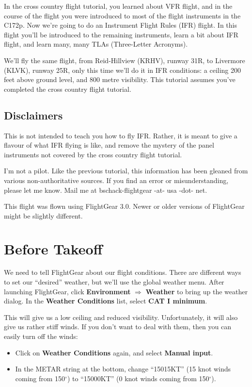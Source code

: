 In the cross country flight tutorial, you learned about VFR flight,
and in the course of the flight you were introduced to most of the
flight instruments in the C172p.  Now we're going to do an Instrument
Flight Rules (IFR) flight.  In this flight you'll be introduced to the
remaining instruments, learn a bit about IFR flight, and learn many,
many TLAs (Three-Letter Acronyms).

We'll fly the same flight, from Reid-Hillview (KRHV), runway 31R, to
Livermore (KLVK), runway 25R, only this time we'll do it in IFR
conditions: a ceiling 200 feet above ground level, and 800 metre
visibility.  This tutorial assumes you've completed the cross country
flight tutorial.
\subsection{Disclaimers}

This is not intended to teach you how to fly IFR.  Rather, it is meant
to give a flavour of what IFR flying is like, and remove the mystery
of the panel instruments not covered by the cross country flight
tutorial.

I'm not a pilot.  Like the previous tutorial, this information has
been gleaned from various non-authoritative sources.  If you find an
error or misunderstanding, please let me know.  Mail me at
bschack-flightgear -at- usa -dot- net.

This flight was flown using FlightGear 3.0.  Newer or older versions
of FlightGear might be slightly different.

\section{Before Takeoff}

We need to tell FlightGear about our flight conditions.  There are
different ways to set our ``desired'' weather, but we'll use the
global weather menu.  After launching FlightGear, click
\textbf{\textsf{Environment}} $\Rightarrow$ \textbf{\textsf{Weather}}
to bring up the weather dialog.  In the \textbf{\textsf{Weather
    Conditions}} list, select \textbf{\textsf{CAT I minimum}}.

This will give us a low ceiling and reduced visibility.
Unfortunately, it will also give us rather stiff winds.  If you don't
want to deal with them, then you can easily turn off the winds:

\begin{itemize}
\item Click on \textbf{\textsf{Weather Conditions}} again, and select
  \textbf{\textsf{Manual input}}.
\item In the METAR string at the bottom, change ``15015KT'' (15 knot
  winds coming from 150$^\circ$) to ``15000KT'' (0 knot winds coming
  from 150$^\circ$).
\end{itemize}

